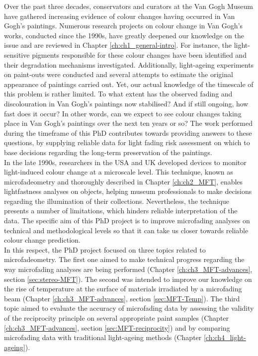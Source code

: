 

Over the past three decades, conservators and curators at the Van Gogh Museum have gathered increasing evidence of colour changes having occurred in Van Gogh’s paintings. Numerous research projects on colour change in Van Gogh’s works, conducted since the 1990s, have greatly deepened our knowledge on the issue and are reviewed in Chapter \ref{ch:ch1_general-intro}. For instance, the light-sensitive pigments responsible for these colour changes have been identified and their degradation mechanisms investigated. Additionally, light-ageing experiments on paint-outs were conducted and several attempts to estimate the original appearance of paintings carried out. Yet, our actual knowledge of the timescale of this problem is rather limited. To what extent has the observed fading and discolouration in Van Gogh’s paintings now stabilised? And if still ongoing, how fast does it occur? In other words, can we expect to see colour changes taking place in Van Gogh’s paintings over the next ten years or so? The work performed during the timeframe of this PhD contributes towards providing answers to these questions, by supplying reliable data for light fading risk assessment on which to base decisions regarding the long-term preservation of the paintings. \\

In the late 1990s, researchers in the \gls{USA} and \gls{UK} developed devices to monitor light-induced colour change at a microscale level. This technique, known as microfadeometry and thoroughly described in Chapter \ref{ch:ch2_MFT}, enables lightfastness analyses on objects, helping museum professionals to make decisions regarding the illumination of their collections. Nevertheless, the technique presents a number of limitations, which hinders reliable interpretation of the data. The specific aim of this PhD project is to improve microfading analyses on technical and methodological levels so that it can take us closer towards reliable colour change prediction. \\ 

In this respect, the PhD project focused on three topics related to microfadeometry. The first one aimed to make technical progress regarding the way microfading analyses are being performed (Chapter \ref{ch:ch3_MFT-advances}, section \ref{sec:stereo-MFT}). The second was intended to improve our knowledge on the rise of temperature at the surface of materials irradiated by a microfading beam (Chapter \ref{ch:ch3_MFT-advances}, section \ref{sec:MFT-Temp}). The third topic aimed to evaluate the accuracy of microfading data by assessing the validity of the reciprocity principle on several appropriate paint samples (Chapter \ref{ch:ch3_MFT-advances}, section \ref{sec:MFT-reciprocity}) and by comparing microfading data with traditional light-ageing methods (Chapter \ref{ch:ch4_light-ageing}). \\

